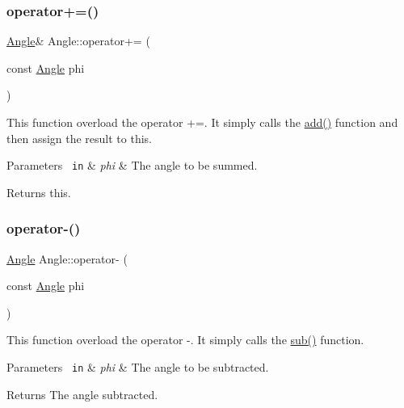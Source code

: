 \subsubsection{\texorpdfstring{operator+=()}{operator+=()}}
{\footnotesize\ttfamily \mbox{\hyperlink{class_angle}{Angle}}\& Angle\+::operator+= (\begin{DoxyParamCaption}\item[{const \mbox{\hyperlink{class_angle}{Angle}}}]{phi }\end{DoxyParamCaption})\hspace{0.3cm}{\ttfamily [inline]}}

This function overload the operator +=. It simply calls the {\ttfamily \mbox{\hyperlink{class_angle_ab7279e3fb4ab12c334153f992ede0f1c}{add()}}} function and then assign the result to this. 
\begin{DoxyParams}[1]{Parameters}
\mbox{\texttt{ in}}  & {\em phi} & The angle to be summed. \\
\hline
\end{DoxyParams}
\begin{DoxyReturn}{Returns}
{\ttfamily this}. 
\end{DoxyReturn}
\mbox{\label{class_angle_a951436019a4c06895ba31a08bf0d6fd2}} 
\subsubsection{\texorpdfstring{operator-\/()}{operator-()}}
{\footnotesize\ttfamily \mbox{\hyperlink{class_angle}{Angle}} Angle\+::operator-\/ (\begin{DoxyParamCaption}\item[{const \mbox{\hyperlink{class_angle}{Angle}}}]{phi }\end{DoxyParamCaption})\hspace{0.3cm}{\ttfamily [inline]}}

This function overload the operator -\/. It simply calls the {\ttfamily \mbox{\hyperlink{class_angle_a74797d883c7a00259f49a9e5dea01c0d}{sub()}}} function. 
\begin{DoxyParams}[1]{Parameters}
\mbox{\texttt{ in}}  & {\em phi} & The angle to be subtracted. \\
\hline
\end{DoxyParams}
\begin{DoxyReturn}{Returns}
The angle subtracted. 
\end{DoxyReturn}
\mbox{\label{class_angle_a54a5489837c16a15320f9249d2cabed6}} 
